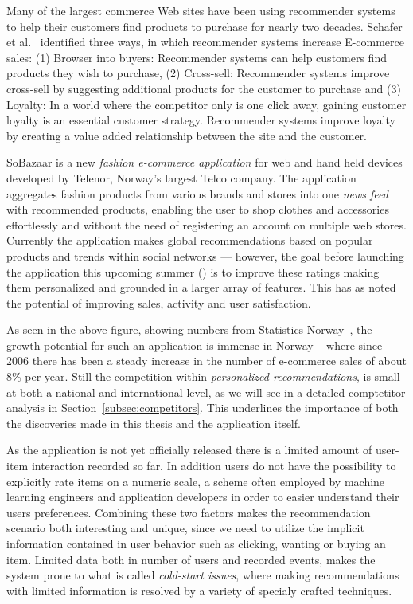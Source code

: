 Many of the largest commerce Web sites have been using recommender systems to
help their customers find products to purchase for nearly two decades.
Schafer et al.~\cite{Schafer1999} identified three ways, in which recommender
systems increase E-commerce sales: (1) Browser into buyers: Recommender systems
can help customers find products they wish to purchase, (2) Cross-sell:
Recommender systems improve cross-sell by suggesting additional products for
the customer to purchase and (3) Loyalty: In a world where the competitor only
is one click away, gaining customer loyalty is an essential customer strategy.
Recommender systems improve loyalty by creating a value added relationship
between the site and the customer.

SoBazaar is a new \textit{fashion e-commerce application} for web and hand held
devices developed by Telenor, Norway's largest Telco company. The application
aggregates fashion products from various brands and stores into one \emph{news
feed} with recommended products, enabling the user to shop clothes and
accessories effortlessly and without the need of registering an account on
multiple web stores. Currently the application makes global recommendations
based on popular products and trends within social networks --- however, the goal
before launching the application this upcoming summer (\the\year) is to improve
these ratings making them personalized and grounded in a larger array of
features. This has as noted the potential of improving sales, activity and user
satisfaction.

\ecommercenorway{}

As seen in the above figure, showing numbers from Statistics
Norway~\cite{statisticsNorway}, the growth potential for such an application is
immense in Norway – where since 2006 there has been a steady increase in the
number of e-commerce sales of about 8\% per year. Still the competition within
\textit{personalized recommendations}, is small at both a national and
international level, as we will see in a detailed comptetitor analysis in
Section~\ref{subsec:competitors}. This underlines the importance of both the
discoveries made in this thesis and the application itself.

As the application is not yet officially released there is a limited amount of
user-item interaction recorded so far. In addition users do not have the
possibility to explicitly rate items on a numeric scale, a scheme often
employed by machine learning engineers and application developers in order to
easier understand their users preferences. Combining these two factors makes
the recommendation scenario both interesting and unique, since we need to
utilize the implicit information contained in user behavior such as clicking,
wanting or buying an item. Limited data both in number of users and recorded
events, makes the system prone to what is called \textit{cold-start issues},
where making recommendations with limited information is resolved by a variety
of specialy crafted techniques.

